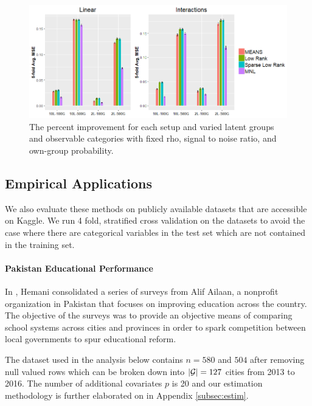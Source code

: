 \documentclass{article}
\theoremstyle{plain}
\theoremstyle{definition}
\theoremstyle{remark}
\begin{document}
\begin{figure}[htp]
  \centering
  \includegraphics[scale=0.6]{figures/rf_simulation_results_with_196se.png}
  \caption {The percent improvement for each setup and varied latent groups and observable categories with fixed rho, signal to noise ratio, and own-group probability.}
  \label{tab:rf_sim_setups}
\end{figure}



\subsection{Empirical Applications}
\label{sec:empirical_applications}

We also evaluate these methods on publicly available datasets that are accessible on Kaggle. We run 4 fold, stratified cross validation on the datasets to avoid the case where there are categorical variables in the test set which are not contained in the training set.


\paragraph{Pakistan Educational Performance}

In \cite{pakistanEducation}, Hemani consolidated a series of surveys from Alif Ailaan, a nonprofit organization in Pakistan that focuses on improving education across the country. The objective of the surveys was to provide an objective means of comparing school systems across cities and provinces in order to spark competition between local governments to spur educational reform.

The dataset used in the analysis below contains $n = 580$ and $504$ after removing null valued rows which can be broken down into $|\mathcal{G}| = 127$ cities from 2013 to 2016. The number of additional covariates $p$ is 20 and our estimation methodology is further elaborated on in Appendix \ref{subsec:estim}.
\end{document}
